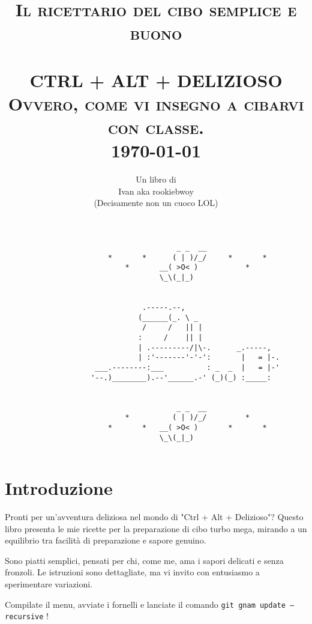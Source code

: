 \documentclass[12pt]{article}
\title{	\normalsize \textsc{Il ricettario del cibo semplice e buono} 	%
		 	\\[1.5cm]								%
			\HRule{0.5pt} \\						%
			\LARGE \textbf{\uppercase{Ctrl + Alt + Delizioso}}\\[0.2cm]	%
			\normalsize \textsc{Ovvero, come vi insegno a cibarvi con classe.}
			\HRule{0.5pt} \\ [0.5cm]		%
			\normalsize \today			%
			\\ [2cm]
		}
\author{
		Un libro di\\	
		Ivan aka rookiebwoy\\	
		(Decisamente non un cuoco LOL)\\ [1cm]
		}
\makeatletter
\def\printtitle{%
    {\centering \@title \par}}
\def\printauthor{%
    {\centering \large \@author}}
\makeatother
\begin{document}
\thispagestyle{empty}		%

\printtitle					%
\begin{lstlisting}
										_ _  __
						*		*	   ( | )/_/		*		*
							*		__( >O< )  			*
									\_\(_|_)   


					            .-----.--,
					           (______(_. \ _
					            /     /   || |
					           :     /    || |
					           | .---------/|\-.      _.-----,
					           | :'-------'-'-':       |   = |-.
					 ___.--------:___          : _  _  |   = |-'
					'--.)________).--'______.-' (_)(_) :_____:


										_ _  __
							*		   ( | )/_/			*
						*		*	__( >O< )  		*		*
									\_\(_|_)   
	
\end{lstlisting}
  	\vfill
\printauthor				%
\newpage

\pagestyle{fancy}

\chead{ } %

\setcounter{page}{1}		%
\section*{Introduzione}
Pronti per un'avventura deliziosa nel mondo di "Ctrl + Alt + Delizioso"? 
Questo libro presenta le mie ricette per la preparazione di cibo turbo mega, 
mirando a un equilibrio tra facilità di preparazione e sapore genuino. 

Sono piatti semplici, pensati per chi, come me, ama i sapori delicati e senza fronzoli. 
Le istruzioni sono dettagliate, ma vi invito con entusiasmo a sperimentare variazioni. 

Compilate il menu, avviate i fornelli e lanciate il comando \texttt{git gnam update ---recursive} !
\end{document}
